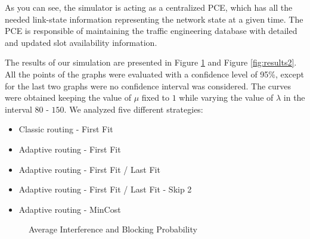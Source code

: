 \documentclass[9pt,twocolumn]{article}
\begin{document}
As you can see, the simulator is acting as a centralized PCE, which has all the needed link-state information representing the network state at a given time. The PCE is responsible of maintaining the traffic engineering database with detailed and updated slot availability information.

The results of our simulation are presented in Figure \ref{fig:results1} and Figure \ref{fig:results2}. All the points of the graphs were evaluated with a confidence level of 95\%, except for the last two graphs were no confidence interval was considered. The curves were obtained keeping the value of $\mu$ fixed to $1$ while varying the value of $\lambda$ in the interval $80$ - $150$. We analyzed five different strategies:

\begin{itemize}
	\setlength{\itemsep}{1pt}
	\setlength{\parskip}{0pt}
	\setlength{\parsep}{0pt}
	\item Classic routing - First Fit
	\item Adaptive routing - First Fit
	\item Adaptive routing - First Fit / Last Fit
	\item Adaptive routing - First Fit / Last Fit - Skip 2
	\item Adaptive routing - MinCost
\end{itemize}

\begin{figure}[!htb]
	\label{fig:results1}
	\caption{Average Interference and Blocking Probability}
\end{figure}
\end{document}
